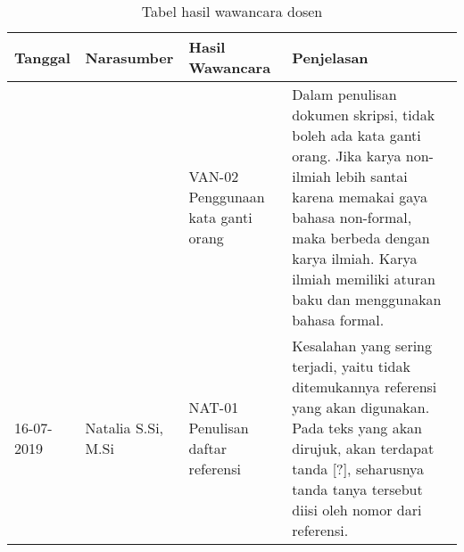 \begin{table}[H]
	\renewcommand{\arraystretch}{1.5}
	\caption {Tabel hasil wawancara dosen} \label{tab:hasil_wawancara3}
	\begin{center}
		\begin{tabular}{|p{2 cm}|>{\raggedright} p{3.5 cm}| p{4 cm}| p{5 cm}|}
		\hline
		Tanggal & Narasumber & Hasil Wawancara & Penjelasan \\ 
		\hline
		 & & VAN-02 \newline Penggunaan kata ganti orang & Dalam penulisan dokumen skripsi, tidak boleh ada kata ganti orang. Jika karya non-ilmiah lebih santai karena memakai gaya bahasa non-formal, maka berbeda dengan karya ilmiah. Karya ilmiah memiliki aturan baku dan menggunakan bahasa formal.  \newline \\ 		
		 \hline
		16-07-2019 & Natalia S.Si, M.Si & NAT-01 \newline Penulisan daftar referensi & Kesalahan yang sering terjadi, yaitu tidak ditemukannya referensi yang akan digunakan. Pada teks yang akan dirujuk, akan terdapat tanda [?], seharusnya tanda tanya tersebut diisi oleh nomor dari referensi. \newline \\ 
		\hline
		\end{tabular}
	\end{center}
\end{table}

